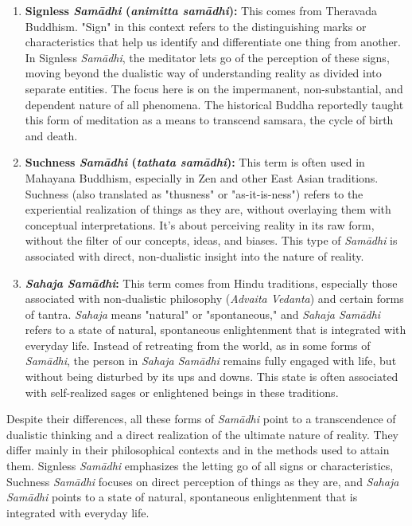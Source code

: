 \documentclass[12pt,openany]{book}
\begin{document}
\begin{enumerate}
\item \textbf{Signless \textit{Samādhi} (\textit{animitta samādhi}):} This comes from Theravada Buddhism. "Sign" in this context refers to the distinguishing marks or characteristics that help us identify and differentiate one thing from another. In Signless \textit{Samādhi}, the meditator lets go of the perception of these signs, moving beyond the dualistic way of understanding reality as divided into separate entities. The focus here is on the impermanent, non-substan\-tial, and dependent nature of all phenomena. The
historical Buddha reportedly taught this form of meditation as a means to transcend samsara, the cycle of birth and death.
\item \textbf{Suchness \textit{Samādhi} (\textit{tathata samādhi}):} This term is often used in Mahayana Buddhism, especially in Zen and other East Asian traditions. Suchness (also translated as "thusness" or "as-it-is-ness") refers to the experiential realization of things as they are, without overlaying them with conceptual interpretations. It's about perceiving reality in its raw form, without the filter of our concepts, ideas, and biases. This type of \textit{Samādhi} is associated with direct, non-dualistic insight into the nature of reality.
\item \textbf{\textit{Sahaja Samādhi}:} This term comes from Hindu traditions, especially those associated with non-dualistic philosophy (\textit{Advaita Vedanta}) and certain forms of tantra. \textit{Sahaja} means "natural" or "spontaneous," and \textit{Sahaja Samādhi} refers to a state of natural, spontaneous enlightenment that is integrated with everyday life. Instead of retreating from the world, as in some forms of \textit{Samādhi}, the person in \textit{Sahaja Samādhi} remains fully engaged with life, but without being disturbed by its ups and downs. This state is often associated with self-realized sages or enlightened beings in these traditions.
\end{enumerate}

Despite their differences, all these forms of \textit{Samādhi} point to a transcendence of dualistic thinking and a direct realization of the ultimate nature of reality. They differ mainly in their philosophical contexts and in the methods used to attain them. Signless \textit{Samādhi} emphasizes the letting go of all signs or characteristics, Suchness \textit{Samādhi} focuses on direct perception of things as they are, and \textit{Sahaja Samādhi} points to a state of natural, spontaneous enlightenment that is integrated with everyday life.
\end{document}

